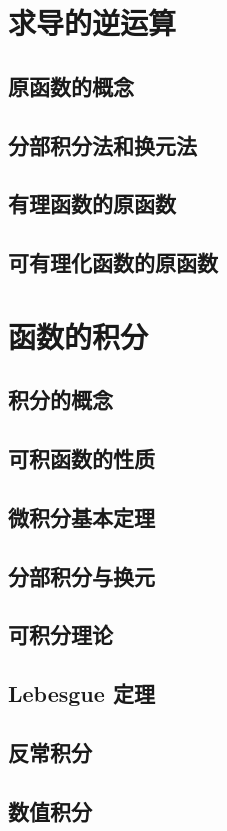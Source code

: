 \documentclass[a4paper, 12pt]{ctexbook}
\begin{document}
    \chapter{求导的逆运算}
        \section{原函数的概念}
        \section{分部积分法和换元法}
        \section{有理函数的原函数}
        \section{可有理化函数的原函数}
    \chapter{函数的积分}
        \section{积分的概念}
        \section{可积函数的性质}
        \section{微积分基本定理}
        \section{分部积分与换元}
        \section{可积分理论}
        \section{Lebesgue 定理}
        \section{反常积分}
        \section{数值积分}
\end{document}
